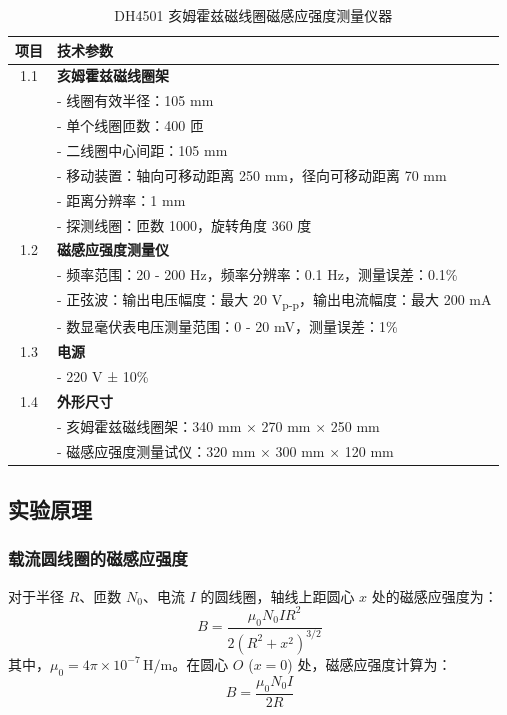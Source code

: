\documentclass[zihao=5, UTF8]{article}
\theoremstyle{MyLineTheoremStyle} %
\theoremstyle{MyBlockTheoremStyle} %
\theoremstyle{MySubsubsectionStyle} %
\begin{document}
\begin{table}[H]
\centering
\begin{tabular}{|c|l|}
\hline
\textbf{项目} & \textbf{技术参数} \\ \hline
1.1 & \textbf{亥姆霍兹磁线圈架} \\ \hline
& \quad - 线圈有效半径：105 mm \\ \hline
& \quad - 单个线圈匝数：400 匝 \\ \hline
& \quad - 二线圈中心间距：105 mm \\ \hline
& \quad - 移动装置：轴向可移动距离 250 mm，径向可移动距离 70 mm \\ \hline
& \quad - 距离分辨率：1 mm \\ \hline
& \quad - 探测线圈：匝数 1000，旋转角度 360 度 \\ \hline
1.2 & \textbf{磁感应强度测量仪} \\ \hline
& \quad - 频率范围：20 - 200 Hz，频率分辨率：0.1 Hz，测量误差：0.1\% \\ \hline
& \quad - 正弦波：输出电压幅度：最大 20 V\textsubscript{p-p}，输出电流幅度：最大 200 mA \\ \hline
& \quad - 数显毫伏表电压测量范围：0 - 20 mV，测量误差：1\% \\ \hline
1.3 & \textbf{电源} \\ \hline
& \quad - 220 V ± 10\% \\ \hline
1.4 & \textbf{外形尺寸} \\ \hline
& \quad - 亥姆霍兹磁线圈架：340 mm × 270 mm × 250 mm \\ \hline
& \quad - 磁感应强度测量试仪：320 mm × 300 mm × 120 mm \\ \hline
\end{tabular}
\caption{DH4501 亥姆霍兹磁线圈磁感应强度测量仪器}
\end{table}

\subsection{实验原理}

\subsubsection{载流圆线圈的磁感应强度}

对于半径 $ R $、匝数 $ N_0 $、电流 $ I $ 的圆线圈，轴线上距圆心 $ x $ 处的磁感应强度为：
$$
B = \frac{\mu_0 N_0 I R^2}{2(R^2 + x^2)^{3/2}}
$$
其中，$ \mu_0 = 4\pi \times 10^{-7} \, \text{H/m} $。在圆心 $ O $ ($ x = 0 $) 处，磁感应强度计算为：
$$
B = \frac{\mu_0 N_0 I}{2R}
$$
\end{document}
